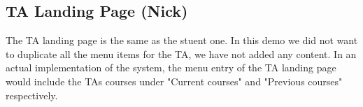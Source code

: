 \subsection{TA Landing Page (Nick)}

The TA landing page is the same as the stuent one. In this demo we did not want to duplicate all the menu items for the TA, we have not added any content. In an actual implementation of the system, the menu entry of the TA landing page would include the TAs courses under "Current courses" and "Previous courses" respectively.
